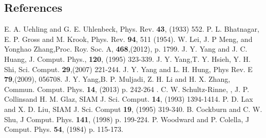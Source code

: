 \documentclass[twoside,twocolumn,prc,floats,amsmath,amssymb]{revtex4} %
\begin{document}
\vspace*{-.25cm}
\begin{thebibliography}{1}
\section{References}
 E. A. Uehling and G. E. Uhlenbeck, Phys. Rev. {\bf 43}, (1933) 552. 
 P. L. Bhatnagar, E. P. Gross and M. Krook, Phys. Rev. {\bf 94}, 511 (1954).
 W. Lei, J. P Meng, and Yonghao Zhang,Proc. Roy. Soc. A, {\bf 468},(2012), p. 1799.
 J. Y. Yang and J. C. Huang, J. Comput. Phys., {\bf 120}, (1995) 323-339.
 J. Y. Yang,T. Y. Hsieh, Y. H. Shi, Sci. Comput. {\bf 29},(2007) 221-244.
 J. Y. Yang and L. H. Hung, Phys Rev. E {\bf 79},(2009), 056708.
 J. Y. Yang,B. P. Muljadi, Z. H. Li and H. X. Zhang, Commun. Comput. Phys. {\bf 14}, (2013) p. 242-264 .
 C. W. Schultz-Rinne, , J. P. Collinsand H. M. Glaz, SIAM J. Sci. Comput. {\bf 14}, (1993) 1394-1414.
 P. D. Lax and X. D. Liu, SIAM J. Sci. Comput {\bf 19}, (1995) 319-340.
 B. Cockburn and C. W. Shu, J Comput. Phys. {\bf 141}, (1998) p. 199-224.
 P. Woodward and P. Colella, J Comput. Phys. {\bf 54}, (1984) p. 115-173.

\end{thebibliography}
%
\end{document}
